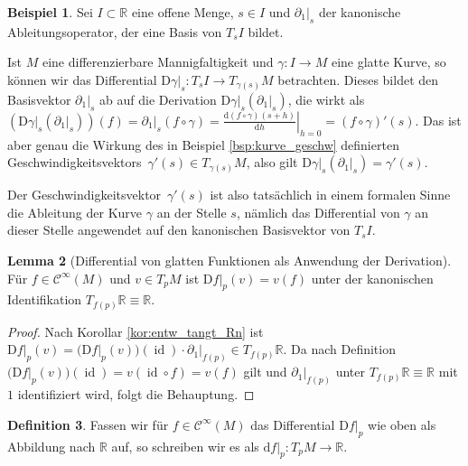 \documentclass[a4paper]{scrreprt}
\numberwithin{equation}{chapter}
\newcommand{\D}{\mathrm{d}}
\newcommand{\DD}{\mathrm{D}}
\DeclareMathOperator{\id}{id}
\newcommand{\sC}{\mathcal{C}^{\infty}}
\theoremstyle{definition}
\newtheorem{defn}{Definition}[section]
\newtheorem{lemma}[defn]{Lemma}
\newtheorem{bsp}[defn]{Beispiel}
\begin{document}
\begin{bsp}
	Sei $I \subset \mathbb R$ eine offene Menge, $s \in I$ und $\left.\partial_1\right|_s$ der kanonische Ableitungsoperator, der eine Basis von $T_s I$ bildet.

	Ist $M$ eine differenzierbare Mannigfaltigkeit und $\gamma\colon I \to M$ eine glatte Kurve, so können wir das Differential $\left.\DD \gamma\right|_s \colon T_sI \to T_{\gamma(s)} M$ betrachten. Dieses bildet den Basisvektor $\left.\partial_1\right|_s$ ab auf die Derivation $\left.\DD \gamma\right|_s(\left.\partial_1\right|_s)$, die wirkt als $\left(\left.\DD \gamma\right|_s(\left.\partial_1\right|_s)\right)(f) = \left.\partial_1\right|_s (f\circ\gamma) = \left.\frac{\D(f\circ\gamma)(s + h)}{\D h}\right|_{h=0} = (f\circ\gamma)'(s)$. Das ist aber genau die Wirkung des in Beispiel \ref{bsp:kurve_geschw} definierten \glqq Geschwindigkeitsvektors\grqq\ $\gamma'(s) \in T_{\gamma(s)} M$, also gilt $\left.\DD \gamma\right|_s(\left.\partial_1\right|_s) = \gamma'(s)$.

	Der \glqq Geschwindigkeitsvektor\grqq\ $\gamma'(s)$ ist also tatsächlich in einem formalen Sinne die Ableitung der Kurve $\gamma$ an der Stelle $s$, nämlich das Differential von $\gamma$ an dieser Stelle angewendet auf den kanonischen Basisvektor von $T_sI$.
\end{bsp}

\begin{lemma}[Differential von glatten Funktionen als Anwendung der Derivation]
	Für $f\in\sC(M)$ und $v \in T_pM$ ist $\left.\DD f\right|_p(v) = v(f)$ unter der kanonischen Identifikation $T_{f(p)}\mathbb R \equiv \mathbb R$.

	\begin{proof}
		Nach Korollar \ref{kor:entw_tangt_Rn} ist $\left.\DD f\right|_p(v) = \Big(\DD f\big|_p(v)\Big)(\id) \cdot \left.\partial_1\right|_{f(p)} \in T_{f(p)}\mathbb R$. Da nach Definition $\Big(\DD f\big|_p(v)\Big)(\id) = v(\id \circ f) = v(f)$ gilt und $\left.\partial_1\right|_{f(p)}$ unter $T_{f(p)}\mathbb R \equiv \mathbb R$ mit $1$ identifiziert wird, folgt die Behauptung.
	\end{proof}
\end{lemma}

\begin{defn}
	Fassen wir für $f \in \sC(M)$ das Differential $\left.\DD f\right|_p$ wie oben als Abbildung nach $\mathbb R$ auf, so schreiben wir es als $\left.\D f\right|_p \colon T_pM \to \mathbb R$.
\end{defn}
\end{document}
